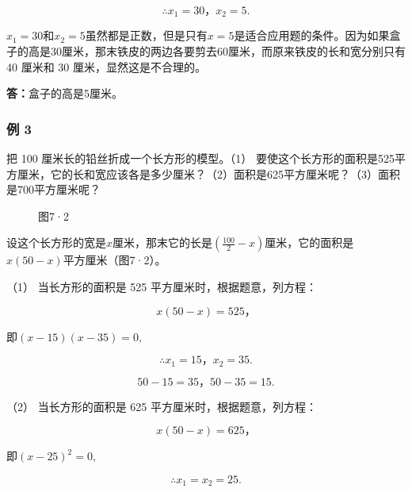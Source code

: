 \[
\therefore x _ {1} = 30\text{，} x _ {2} = 5.
\]

\(x_{1} = 30\)和\(x_{2} = 5\)虽然都是正数，但是只有\(x = 5\)是适合应用题的条件。因为如果盒子的高是30厘米，那末铁皮的两边各要剪去60厘米，而原来铁皮的长和宽分别只有40
厘米和 30 厘米，显然这是不合理的。

\textbf{答：}盒子的高是5厘米。

\subsubsection{例 3}

把 100 厘米长的铅丝折成一个长方形的模型。（1）
要使这个长方形的面积是525平方厘米，它的长和宽应该各是多少厘米？（2）面积是625平方厘米呢？（3）面积是700平方厘米呢？

\begin{figure}
\centering
{}
\caption{图7·2}
\end{figure}

 设这个长方形的宽是\(x\)厘米，那末它的长是\(\left(\frac{100}{2} - x\right)\)厘米，它的面积是\(x(50 - x)\)平方厘米（图7·2）。

（1） 当长方形的面积是 525 平方厘米时，根据题意，列方程：

\[
x (50 - x) = 525\text{，}
\]

即\((x - 15)(x - 35) = 0,\)

\[
\therefore x _ {1} = 15\text{，} x _ {2} = 35.
\]

\[
50 - 15 = 35\text{，} 50 - 35 = 15.
\]

（2） 当长方形的面积是 625 平方厘米时，根据题意，列方程：

\[
x (50 - x) = 625\text{，}
\]

即\((x - 25)^{2} = 0,\)

\[
\therefore x _ {1} = x _ {2} = 25.
\]


